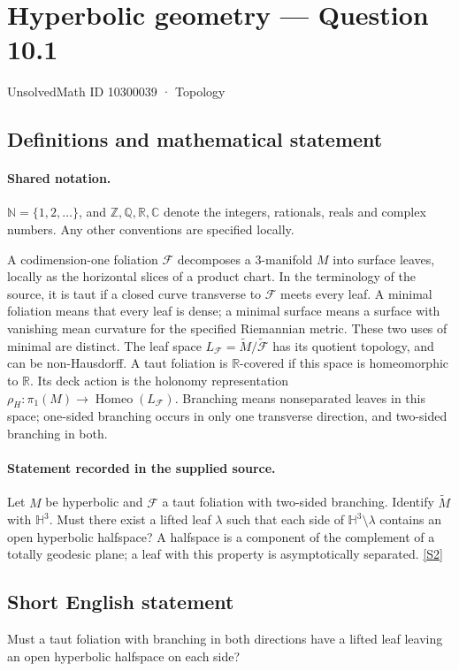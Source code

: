 \documentclass[11pt]{article}
\newcommand{\sref}[2]{\hyperlink{source:#1:#2}{[S#2]}}
\begin{document}
\setcounter{section}{10300038}
\section{Hyperbolic geometry — Question 10.1}\label{10300039}
{\small\sffamily UnsolvedMath ID 10300039 · Topology}
\subsection{Definitions and mathematical statement}

\paragraph{Shared notation.}$\mathbb N=\{1,2,\ldots\}$, and $\mathbb Z,\mathbb Q,\mathbb R,\mathbb C$ denote the integers, rationals, reals and complex numbers. Any other conventions are specified locally.


A codimension-one foliation $\mathcal F$ decomposes a $3$-manifold $M$ into surface leaves, locally as the horizontal slices of a product chart. In the terminology of the source, it is taut if a closed curve transverse to $\mathcal F$ meets every leaf. A minimal foliation means that every leaf is dense; a minimal surface means a surface with vanishing mean curvature for the specified Riemannian metric. These two uses of minimal are distinct. The leaf space $L_{\mathcal F}=\widetilde M/\widetilde{\mathcal F}$ has its quotient topology, and can be non-Hausdorff. A taut foliation is $\mathbb R$-covered if this space is homeomorphic to $\mathbb R$. Its deck action is the holonomy representation $\rho_H:\pi_1(M)\longrightarrow\operatorname{Homeo}(L_{\mathcal F})$. Branching means nonseparated leaves in this space; one-sided branching occurs in only one transverse direction, and two-sided branching in both.
\paragraph{Statement recorded in the supplied source.}
Let $M$ be hyperbolic and $\mathcal F$ a taut foliation with two-sided branching. Identify $\widetilde M$ with $\mathbb H^3$. Must there exist a lifted leaf $\lambda$ such that each side of $\mathbb H^3\setminus\lambda$ contains an open hyperbolic halfspace? A halfspace is a component of the complement of a totally geodesic plane; a leaf with this property is asymptotically separated. \sref{10300039}{2}
\subsection{Short English statement}
Must a taut foliation with branching in both directions have a lifted leaf leaving an open hyperbolic halfspace on each side?
\end{document}
